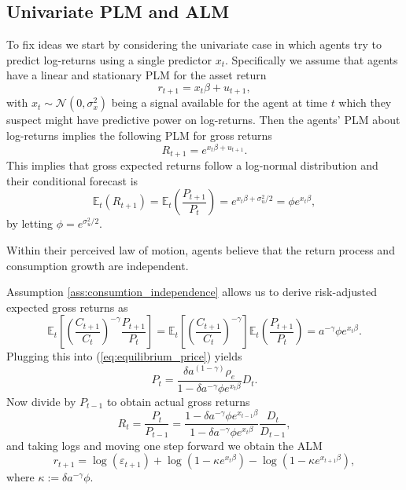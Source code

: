 \documentclass[11pt]{article}
\begin{document}
\subsection{Univariate PLM and ALM}

To fix ideas we start by considering the univariate case in which agents try to predict log-returns using a single predictor $x_t$.
Specifically we assume that agents have a linear and stationary PLM for the asset return
\begin{equation}\label{eq:plm_univariate}
    r_{t+1} =  x_{t} \beta + u_{t+1},
\end{equation}
with $x_t \sim \mathcal{N}(0, \sigma^2_x)$ being a signal available for the agent at time $t$ which they suspect might have predictive power on log-returns.
Then the agents' PLM about log-returns implies the following PLM for gross returns
\begin{equation}
    R_{t+1} = e ^ {x_{t} \beta + u_{t+1}}.
\end{equation}
This implies that gross expected returns follow a log-normal distribution and their conditional forecast is
\begin{equation}
    \mathbb{E}_t(R_{t+1}) = \mathbb{E}_t\left(\frac{P_{t+1}}{P_t}\right) = e^{x_{t} \beta + \sigma^2_u / 2} = \phi e^{x_{t} \beta},
\end{equation}
by letting $\phi = e^{\sigma^2_u / 2}$.

\begin{assumption}\label{ass:consumtion_independence}
    Within their perceived law of motion, agents believe that the return process and consumption growth are independent.
\end{assumption}
Assumption \ref{ass:consumtion_independence} allows us to derive risk-adjusted expected gross returns as
\begin{equation}
    \mathbb{E}_t \left[\left( \frac{C_{t+1}}{C_t}\right)^{- \gamma} \frac{P_{t+1}}{P_t} \right] = \mathbb{E}_t \left[\left( \frac{C_{t+1}}{C_t}\right)^{- \gamma} \right] \mathbb{E}_t\left(\frac{P_{t+1}}{P_t}\right) = a ^ {-\gamma} \phi e^{x_t \beta}.
\end{equation}
Plugging this into (\ref{eq:equilibrium_price}) yields
\begin{equation}
    P_t = \frac{\delta a^{(1 - \gamma)} \rho_e}{1 - \delta a^{- \gamma} \phi e^{x_t \beta}} D_t.
\end{equation} 
Now divide by $P_{t-1}$ to obtain actual gross returns
\begin{equation}
    R_{t} = \frac{P_{t}}{P_{t-1}} = \frac{1 - \delta a^{- \gamma} \phi e^{x_{t-1} \beta}}{1 - \delta a^{- \gamma} \phi e^{x_{t} \beta}} \frac{D_t}{D_{t-1}},
\end{equation}
and taking logs and moving one step forward we obtain the ALM 
\begin{equation}\label{eq:alm_univariate}
    r_{t+1} = \log(\varepsilon_{t+1}) + \log(1 - \kappa e^{x_{t} \beta}) - \log(1 - \kappa e^{x_{t+1} \beta}),
\end{equation}
where $\kappa := \delta a^{- \gamma} \phi$.
\end{document}
